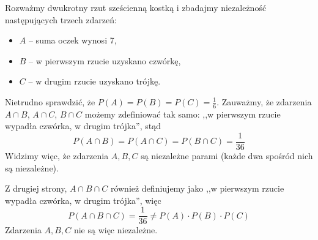 \begin{example}
    Rozważmy dwukrotny rzut sześcienną kostką i zbadajmy niezależność następujących trzech zdarzeń:
    \begin{itemize}
        \item $A$ -- suma oczek wynosi 7,
        \item $B$ -- w pierwszym rzucie uzyskano czwórkę,
        \item $C$ -- w drugim rzucie uzyskano trójkę.
    \end{itemize}

    Nietrudno sprawdzić, że $P(A) = P(B) = P(C) = \frac{1}{6}$. Zauważmy, że zdarzenia $A \cap B$, $A \cap C$, $B \cap C$ możemy zdefiniować tak samo: ,,w pierwszym rzucie wypadła czwórka, w drugim trójka'', stąd
    $$P(A \cap B) = P(A \cap C) = P(B \cap C) = \frac{1}{36}$$
    Widzimy więc, że zdarzenia $A, B, C$ są niezależne parami (każde dwa spośród nich są niezależne).
    \bigskip

    Z drugiej strony, $A \cap B \cap C$ również definiujemy jako ,,w pierwszym rzucie wypadła czwórka, w drugim trójka'', więc
    $$P(A \cap B \cap C) = \frac{1}{36} \neq P(A) \cdot P(B) \cdot P(C)$$
    Zdarzenia $A, B, C$ nie są więc niezależne.
\end{example}

